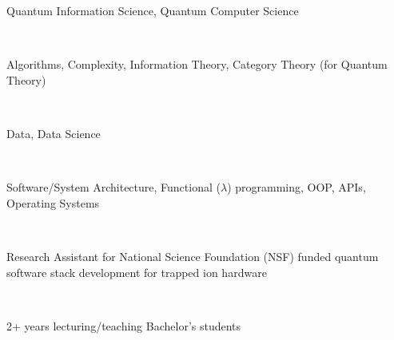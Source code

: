 \begin{itemize}[leftmargin=0.0in]
    \small{\item{{Quantum Information Science, Quantum Computer Science}}} \\
    \vspace{-4pt}
    \small{\item{{Algorithms, Complexity, Information Theory, Category Theory (for Quantum Theory)}}} \\
    \vspace{-4pt}
    \small{\item{{Data, Data Science}}} \\
    \vspace{-4pt}
    \small{\item{{Software/System Architecture, Functional ($\lambda$) programming, OOP, APIs, Operating Systems}}} \\
    \vspace{-4pt}    
    \small{\item{{Research Assistant for National Science Foundation (NSF) funded quantum software stack development for trapped ion hardware}}} \\
    \vspace{-4pt} 
    \small{\item{{2+ years lecturing/teaching Bachelor's students}}} \\
\end{itemize}

